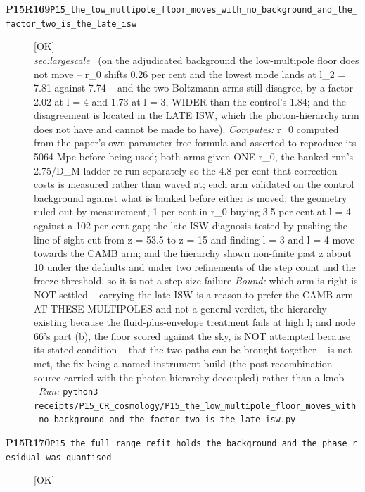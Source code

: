 \begin{description}
\item[\textbf{P15R169}\quad\texttt{P15\_the\_low\_multipole\_floor\_moves\_with\_no\_background\_and\_the\_factor\_two\_is\_the\_late\_isw}]\hfill\textsf{[OK]}\\
\textit{sec:largescale} \ (on the adjudicated background the low-multipole floor does not move -- r\_0 shifts 0.26 per cent and the lowest mode lands at l\_2 = 7.81 against 7.74 -- and the two Boltzmann arms still disagree, by a factor 2.02 at l = 4 and 1.73 at l = 3, WIDER than the control's 1.84; and the disagreement is located in the LATE ISW, which the photon-hierarchy arm does not have and cannot be made to have). 
\emph{Computes:} r\_0 computed from the paper's own parameter-free formula and asserted to reproduce its 5064 Mpc before being used; both arms given ONE r\_0, the banked run's 2.75/D\_M ladder re-run separately so the 4.8 per cent that correction costs is measured rather than waved at; each arm validated on the control background against what is banked before either is moved; the geometry ruled out by measurement, 1 per cent in r\_0 buying 3.5 per cent at l = 4 against a 102 per cent gap; the late-ISW diagnosis tested by pushing the line-of-sight cut from z = 53.5 to z = 15 and finding l = 3 and l = 4 move towards the CAMB arm; and the hierarchy shown non-finite past z about 10 under the defaults and under two refinements of the step count and the freeze threshold, so it is not a step-size failure
 \emph{Bound:} which arm is right is NOT settled -- carrying the late ISW is a reason to prefer the CAMB arm AT THESE MULTIPOLES and not a general verdict, the hierarchy existing because the fluid-plus-envelope treatment fails at high l; and node 66's part (b), the floor scored against the sky, is NOT attempted because its stated condition -- that the two paths can be brought together -- is not met, the fix being a named instrument build (the post-recombination source carried with the photon hierarchy decoupled) rather than a knob
\ \emph{Run:} \texttt{python3 receipts/P15\_CR\_cosmology/P15\_the\_low\_multipole\_floor\_moves\_with\_no\_background\_and\_the\_factor\_two\_is\_the\_late\_isw.py}
\item[\textbf{P15R170}\quad\texttt{P15\_the\_full\_range\_refit\_holds\_the\_background\_and\_the\_phase\_residual\_was\_quantised}]\hfill\textsf{[OK]}\\

\end{description}
